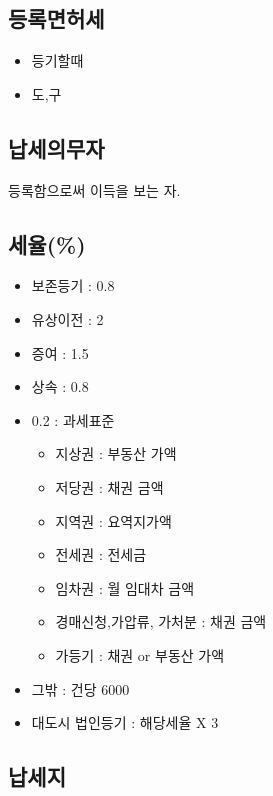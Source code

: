 \documentclass{oblivoir}
\begin{document}
\begin{multicols}{2}
\section{등록면허세}\label{uxb4f1uxb85duxba74uxd5c8uxc138}

\begin{itemize}
\itemsep1pt\parskip0pt
\item
  등기할때
\item
  도,구
\end{itemize}

\subsection{납세의무자}\label{uxb0a9uxc138uxc758uxbb34uxc790-1}

등록함으로써 이득을 보는 자.

\subsection{세율(\%)}\label{uxc138uxc728-1}

\begin{itemize}
\itemsep1pt\parskip0pt
\item
  보존등기 : 0.8
\item
  유상이전 : 2
\item
  증여 : 1.5
\item
  상속 : 0.8
\item
  0.2 : 과세표준

  \begin{itemize}
  \itemsep1pt\parskip0pt
  \item
    지상권 : 부동산 가액
  \item
    저당권 : 채권 금액
  \item
    지역권 : 요역지가액
  \item
    전세권 : 전세금
  \item
    임차권 : 월 임대차 금액
  \item
    경매신청,가압류, 가처분 : 채권 금액
  \item
    가등기 : 채권 or 부동산 가액
  \end{itemize}
\item
  그밖 : 건당 6000
\item
  대도시 법인등기 : 해당세율 X 3
\end{itemize}

\subsection{납세지}\label{uxb0a9uxc138uxc9c0}


\end{multicols}
\end{document}
